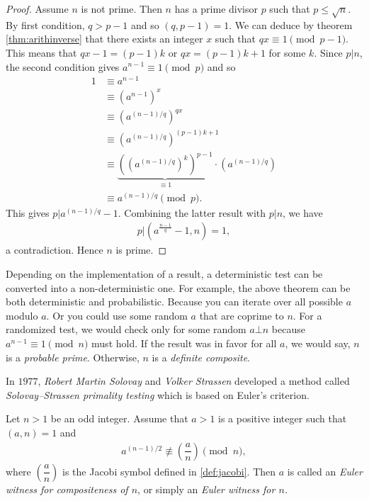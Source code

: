 \documentclass{subfiles}
\begin{document}
	\begin{proof}
		Assume $n$ is not prime. Then $n$ has a prime divisor $p$ such that $p \leq \sqrt n$. By first condition, $q>p-1$ and so $(q, p-1)=1$. We can deduce by theorem \eqref{thm:arithinverse} that there exists an integer $x$ such that $qx \equiv 1 \pmod {p-1}$. This means that $qx-1 = (p-1)k$ or $qx = (p-1)k+1$ for some $k$. Since $p|n$, the second condition gives $a^{n-1} \equiv 1 \pmod p$ and so
		\begin{align*}
			1 & \equiv a^{n-1} \\
			& \equiv \left(a^{n-1}\right)^{x}\\
			& \equiv \left(a^{(n-1)/q}\right)^{qx}\\
			& \equiv \left(a^{(n-1)/q}\right)^{(p-1)k+1}\\
			& \equiv \underbrace{\left(\left(a^{(n-1)/q}\right)^{k}\right)^{p-1}}_{\equiv 1} \cdot \left(a^{(n-1)/q}\right)\\
			& \equiv a^{(n-1)/q} \pmod p.
		\end{align*}
		This gives $p|a^{(n-1)/q}-1$. Combining the latter result with $p|n$, we have
		\begin{align*}
			p\big|\left(a^{\frac{n-1}{q}}-1,n\right)=1,
		\end{align*}
		a contradiction. Hence $n$ is prime.
	\end{proof}
	
	\begin{note}
		Depending on the implementation of a result, a deterministic test can be converted into a non-deterministic one. For example, the above theorem can be both deterministic and probabilistic. Because you can iterate over all possible $a$ modulo $a$. Or you could use some random $a$ that are coprime to $n$. For a randomized test, we would check only for some random $a\bot n$ because $a^{n-1}\equiv1\pmod n$ must hold. If the result was in favor for all $a$, we would say, $n$ is a \textit{probable prime}. Otherwise, $n$ is a \textit{definite composite}.
	\end{note}
	In $1977$, \textit{Robert Martin Solovay} and \textit{Volker Strassen} developed a method called \textit{Solovay--Strassen primality testing} which is based on Euler's criterion. 
	
	\begin{definition}
		Let $n>1$ be an odd integer. Assume that $a>1$ is a positive integer such that $(a,n)=1$ and 
		\begin{align*}
			a^{(n-1)/2} \not \equiv \left(\dfrac{a}{n}\right) \pmod n,
		\end{align*}
		where $\left(\dfrac{a}{n}\right)$ is the Jacobi symbol defined in \eqref{def:jacobi}. Then $a$ is called an \textit{Euler witness for compositeness of $n$}, or simply an \textit{Euler witness for $n$.}
	\end{definition}
	
\end{document}
